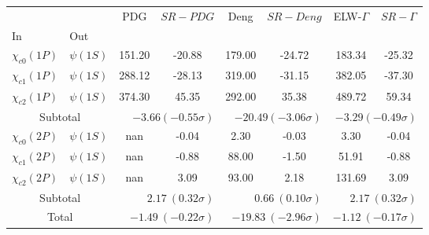 \begin{tabular}{|l|l|c|c|c|c|c|c|}%
\hline%
&&PDG&$SR-PDG$&Deng&$SR-Deng$&ELW-$\Gamma$&$SR-\Gamma$\\%
In&Out&&&&&&\\%
\hline%
$\chi_{c0}(1P)$&$\psi(1S)$&151.20&-20.88&179.00&-24.72&183.34&-25.32\\%
$\chi_{c1}(1P)$&$\psi(1S)$&288.12&-28.13&319.00&-31.15&382.05&-37.30\\%
$\chi_{c2}(1P)$&$\psi(1S)$&374.30&45.35&292.00&35.38&489.72&59.34\\%
\hline%
\hline%
\multicolumn{2}{|c|}{Subtotal}&\multicolumn{2}{|r|}{$-3.66 (-0.55\sigma)$}&\multicolumn{2}{|r|}{$-20.49 (-3.06\sigma)$}&\multicolumn{2}{|r|}{$-3.29 (-0.49\sigma)$}\\%
\hline%
\hline%
$\chi_{c0}(2P)$&$\psi(1S)$&nan&-0.04&2.30&-0.03&3.30&-0.04\\%
$\chi_{c1}(2P)$&$\psi(1S)$&nan&-0.88&88.00&-1.50&51.91&-0.88\\%
$\chi_{c2}(2P)$&$\psi(1S)$&nan&3.09&93.00&2.18&131.69&3.09\\%
\hline%
\hline%
\multicolumn{2}{|c|}{Subtotal}&\multicolumn{2}{|r|}{$2.17~(0.32\sigma)$}&\multicolumn{2}{|r|}{$0.66~(0.10\sigma)$}&\multicolumn{2}{|r|}{$2.17~(0.32\sigma)$}\\%
\hline%
\hline%
\multicolumn{2}{|c|}{Total}&\multicolumn{2}{|r|}{$-1.49~(-0.22\sigma)$}&\multicolumn{2}{|r|}{$-19.83~(-2.96\sigma)$}&\multicolumn{2}{|r|}{$-1.12~(-0.17\sigma)$}\\%
\hline%
\end{tabular}